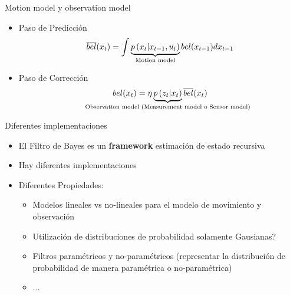 \begin{frame}{Motion model y observation model}
    \begin{itemize}
         \item Paso de Predicción
        \begin{equation*}
            \overline{bel}(x_{t}) = \int \underbrace{p\left(x_{t} | x_{t-1}, u_{t} \right)}_{\text{Motion model}} bel(x_{t-1}) d x_{t-1}
        \end{equation*}
        \item Paso de Corrección
        \begin{equation*}
            bel(\state_{t}) = \eta \underbrace{p\left(\observation_{t} |\state_{t} \right)}_{\text{\makebox[0pt]{Observation model (Measurement model o Sensor model)}}} \overline{bel}(\state_{t})
        \end{equation*}
    \end{itemize}
    
    
\end{frame}

\begin{frame}{Diferentes implementaciones}
    \begin{itemize}
        \item El Filtro de Bayes es un {\bf framework} estimación de estado recursiva
        \item Hay diferentes implementaciones
        \item Diferentes Propiedades:
        \begin{itemize}
            \item Modelos lineales vs no-lineales para el modelo de movimiento y observación
            \item Utilización de distribuciones de probabilidad solamente Gausianas? 
            \item Filtros paramétricos y no-paramétricos (representar la distribución de probabilidad de manera paramétrica o no-paramétrica)
            \item ...
        \end{itemize}
    \end{itemize}
    
\end{frame}

